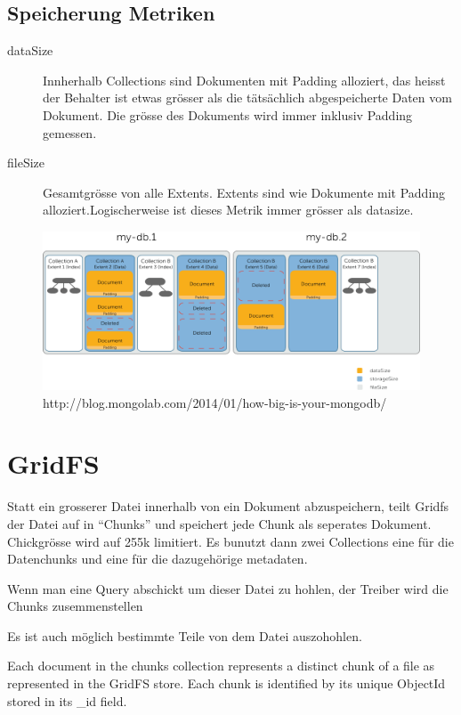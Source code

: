 \documentclass[a4paper,10pt]{scrartcl}
\begin{document}
\subsection{Speicherung Metriken}
\begin{description}
 \item [dataSize]
Innherhalb Collections sind Dokumenten mit Padding alloziert, das heisst der Behalter ist etwas grösser als die 
tätsächlich abgespeicherte Daten vom Dokument. Die grösse des Dokuments wird immer inklusiv Padding gemessen.
\item [fileSize] Gesamtgrösse von alle Extents. Extents sind wie Dokumente mit Padding alloziert.Logischerweise ist 
dieses Metrik immer grösser als datasize.
\end{description}
\begin{figure}[h!]
 \centering
 \includegraphics[scale=1]{./de2.png}
\caption{http://blog.mongolab.com/2014/01/how-big-is-your-mongodb/}
 \end{figure}

\section{GridFS}
Statt ein grosserer Datei innerhalb von ein Dokument abzuspeichern, teilt Gridfs der Datei auf in ``Chunks'' und 
speichert jede Chunk als seperates Dokument. Chickgrösse wird auf 255k limitiert. Es bunutzt dann zwei Collections eine 
für die Datenchunks und eine für die dazugehörige metadaten. 

Wenn man eine Query abschickt um dieser Datei zu hohlen, der Treiber wird die Chunks zusemmenstellen

Es ist auch möglich bestimmte Teile von dem Datei auszohohlen.

Each document in the chunks collection represents a distinct chunk of a file as represented in the GridFS store. Each 
chunk is identified by its unique ObjectId stored in its \_id field.
\end{document}
